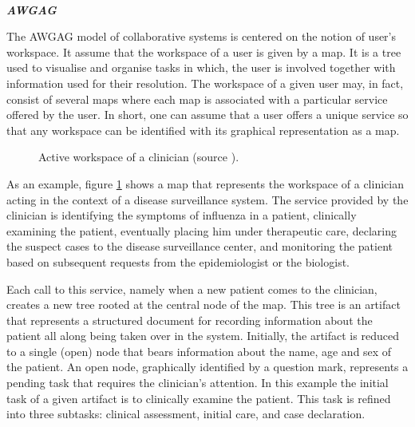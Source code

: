 ~

\noindent\textbf{\textit{AWGAG \cite{badouel2015active}}}

The AWGAG model of collaborative systems is centered on the notion of user's workspace. It assume that the workspace of a user is given by a map. It is a tree used to visualise and organise tasks in which, the user is involved together with information used for their resolution. The workspace of a given user may, in fact, consist of several maps where each map is associated with a particular service offered by the user. In short, one can assume that a user offers a unique service so that any workspace can be identified with its graphical representation as a map.
\begin{figure}[ht!]
	\noindent
	\caption{Active workspace of a clinician (source \cite{badouel2015active}).}
	\label{chap1:fig:aw-clinician}
\end{figure}

As an example, figure \ref{chap1:fig:aw-clinician} shows a map that represents the workspace of a clinician acting in the context of a disease surveillance system. The service provided by the clinician is identifying the symptoms of influenza in a patient, clinically examining the patient, eventually placing him under therapeutic care, declaring the suspect cases to the disease surveillance center, and monitoring the patient based on subsequent requests from the epidemiologist or the biologist.

Each call to this service, namely when a new patient comes to the clinician, creates a new tree rooted at the central node of the map. This tree is an artifact that represents a structured document for recording information about the patient all along being taken over in the system. Initially, the artifact is reduced to a single (open) node that bears information about the name, age and sex of the patient. An open node, graphically identified by a question mark, represents a pending task that requires the clinician's attention. In this example the initial task of a given artifact is to clinically examine the patient. This task is refined into three subtasks: clinical assessment, initial care, and case declaration.

